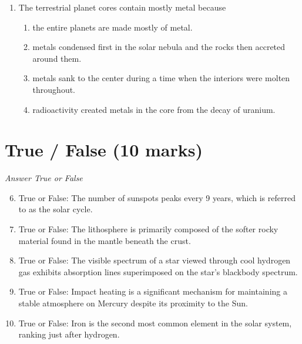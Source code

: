\documentclass[12pt]{article}
\begin{document}
\begin{enumerate}[label=\arabic*.]
\begin{enumerate}[label=(\alph*)]
    \item the presence of belts zones and storms
    \item an equatorial wind speed of more than 900 miles per hour
    \item significant "shear" between bands of circulation at different latitudes
\end{enumerate}
\item The terrestrial planet cores contain mostly metal because
\begin{enumerate}[label=(\alph*)]
    \item the entire planets are made mostly of metal.
    \item metals condensed first in the solar nebula and the rocks then accreted around them.
    \item metals sank to the center during a time when the interiors were molten throughout.
    \item radioactivity created metals in the core from the decay of uranium.
\end{enumerate}
\end{enumerate}

\section*{True / False (10 marks)}
\textit{Answer True or False}
\begin{enumerate}[label=\arabic*.]
\setcounter{enumi}{5}
\item True or False: The number of sunspots peaks every 9 years, which is referred to as the solar cycle.
\item True or False: The lithosphere is primarily composed of the softer rocky material found in the mantle beneath the crust.
\item True or False: The visible spectrum of a star viewed through cool hydrogen gas exhibits absorption lines superimposed on the star's blackbody spectrum.
\item True or False: Impact heating is a significant mechanism for maintaining a stable atmosphere on Mercury despite its proximity to the Sun.
\item True or False: Iron is the second most common element in the solar system, ranking just after hydrogen.
\end{enumerate}
\end{document}
